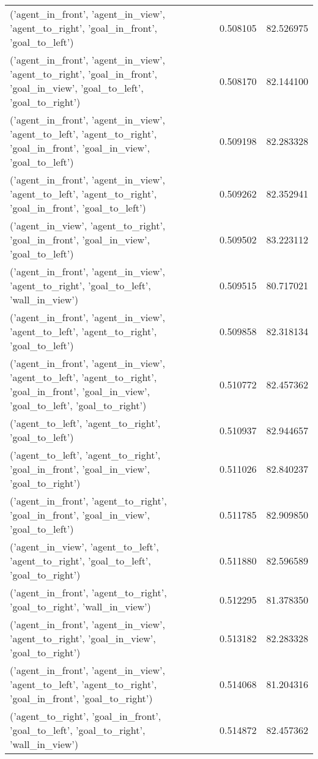 \begin{tabular}{lrr}
('agent\_in\_front', 'agent\_in\_view', 'agent\_to\_right', 'goal\_in\_front', 'goal\_to\_left') & 0.508105 & 82.526975 \\
('agent\_in\_front', 'agent\_in\_view', 'agent\_to\_right', 'goal\_in\_front', 'goal\_in\_view', 'goal\_to\_left', 'goal\_to\_right') & 0.508170 & 82.144100 \\
('agent\_in\_front', 'agent\_in\_view', 'agent\_to\_left', 'agent\_to\_right', 'goal\_in\_front', 'goal\_in\_view', 'goal\_to\_left') & 0.509198 & 82.283328 \\
('agent\_in\_front', 'agent\_in\_view', 'agent\_to\_left', 'agent\_to\_right', 'goal\_in\_front', 'goal\_to\_left') & 0.509262 & 82.352941 \\
('agent\_in\_view', 'agent\_to\_right', 'goal\_in\_front', 'goal\_in\_view', 'goal\_to\_left') & 0.509502 & 83.223112 \\
('agent\_in\_front', 'agent\_in\_view', 'agent\_to\_right', 'goal\_to\_left', 'wall\_in\_view') & 0.509515 & 80.717021 \\
('agent\_in\_front', 'agent\_in\_view', 'agent\_to\_left', 'agent\_to\_right', 'goal\_to\_left') & 0.509858 & 82.318134 \\
('agent\_in\_front', 'agent\_in\_view', 'agent\_to\_left', 'agent\_to\_right', 'goal\_in\_front', 'goal\_in\_view', 'goal\_to\_left', 'goal\_to\_right') & 0.510772 & 82.457362 \\
('agent\_to\_left', 'agent\_to\_right', 'goal\_to\_left') & 0.510937 & 82.944657 \\
('agent\_to\_left', 'agent\_to\_right', 'goal\_in\_front', 'goal\_in\_view', 'goal\_to\_right') & 0.511026 & 82.840237 \\
('agent\_in\_front', 'agent\_to\_right', 'goal\_in\_front', 'goal\_in\_view', 'goal\_to\_left') & 0.511785 & 82.909850 \\
('agent\_in\_view', 'agent\_to\_left', 'agent\_to\_right', 'goal\_to\_left', 'goal\_to\_right') & 0.511880 & 82.596589 \\
('agent\_in\_front', 'agent\_to\_right', 'goal\_to\_right', 'wall\_in\_view') & 0.512295 & 81.378350 \\
('agent\_in\_front', 'agent\_in\_view', 'agent\_to\_right', 'goal\_in\_view', 'goal\_to\_right') & 0.513182 & 82.283328 \\
('agent\_in\_front', 'agent\_in\_view', 'agent\_to\_left', 'agent\_to\_right', 'goal\_in\_front', 'goal\_to\_right') & 0.514068 & 81.204316 \\
('agent\_to\_right', 'goal\_in\_front', 'goal\_to\_left', 'goal\_to\_right', 'wall\_in\_view') & 0.514872 & 82.457362 \\

\end{tabular}
